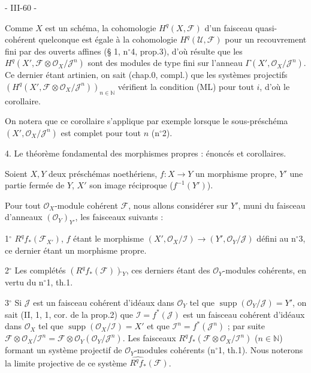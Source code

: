 \newpage


- III-60 -

Comme $X$ est un schéma, la cohomologie $H^q(X, \mathcal{F})$ d'un faisceau quasi-cohérent quelconque est égale à la cohomologie $H^q(\mathcal{U}, \mathcal{F})$ pour un recouvrement fini par des ouverts affines (§ 1, n$^\circ$4, prop.3), d'où résulte que les $H^q(X', \mathcal{F} \otimes \mathcal{O}_X / \mathcal{J}^n)$ sont des modules de type fini sur l'anneau $\Gamma(X', \mathcal{O}_X / \mathcal{J}^n)$. Ce dernier étant artinien, on sait (chap.0, compl.) que les systèmes projectifs $(H^q(X', \mathcal{F} \otimes \mathcal{O}_X / \mathcal{J}^n))_{n \in \mathbb{N}}$ vérifient la condition (ML) pour tout $i$, d'où le corollaire.

On notera que ce corollaire s'applique par exemple lorsque le sous-préschéma $(X', \mathcal{O}_X / \mathcal{J}^n)$ est complet pour tout $n$ (n$^\circ$2).

4. Le théorème fondamental des morphismes propres : énoncés et corollaires.

Soient $X, Y$ deux préschémas noethériens, $f: X \to Y$ un morphisme propre, $Y'$ une partie fermée de $Y$, $X'$ son image réciproque ($f^{-1}(Y')$).

Pour tout $\mathcal{O}_X$-module cohérent $\mathcal{F}$, nous allons considérer sur $Y'$, muni du faisceau d'anneaux $(\mathcal{O}_Y)_{Y'}$, les faisceaux suivants :

1$^\circ$ $R^q f_* (\mathcal{F}_{X'})$, $f$ étant le morphisme $(X', \mathcal{O}_X / \mathcal{I}) \to (Y', \mathcal{O}_Y / \mathcal{J})$ défini au n$^\circ$3, ce dernier étant un morphisme propre.

2$^\circ$ Les complétés $(R^q f_* (\mathcal{F})) \hat{}_Y$, ces derniers étant des $\mathcal{O}_Y$-modules cohérents, en vertu du n$^\circ$1, th.1.

3$^\circ$ Si $\mathcal{J}$ est un faisceau cohérent d'idéaux dans $\mathcal{O}_Y$ tel que $\operatorname{supp}(\mathcal{O}_Y / \mathcal{J}) = Y'$, on sait (II, 1, 1, cor. de la prop.2) que $\mathcal{I} = f^*(\mathcal{J})$ est un faisceau cohérent d'idéaux dans $\mathcal{O}_X$ tel que $\operatorname{supp}(\mathcal{O}_X / \mathcal{I}) = X'$ et que $\mathcal{I}^n = f^*(\mathcal{J}^n)$ ; par suite $\mathcal{F} \otimes \mathcal{O}_X / \mathcal{I}^n = \mathcal{F} \otimes \mathcal{O}_Y (\mathcal{O}_Y / \mathcal{J}^n)$. Les faisceaux $R^q f_* (\mathcal{F} \otimes \mathcal{O}_X / \mathcal{I}^n)$ ($n \in \mathbb{N}$) formant un système projectif de $\mathcal{O}_Y$-modules cohérents (n$^\circ$1, th.1). Nous noterons la limite projective de ce système $\widehat{R^q f_*} (\mathcal{F})$.

